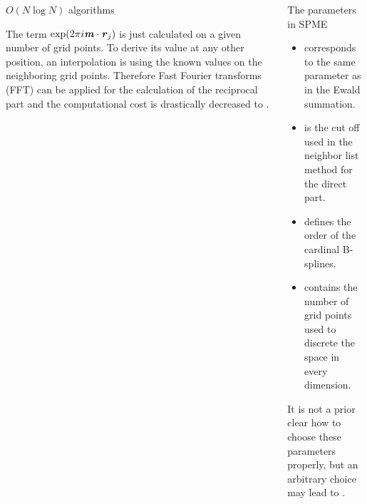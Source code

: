 \documentclass[final,hyperref={pdfpagelabels=false}]{beamer}
\begin{document}
\begin{frame}{}
\begin{columns}[t]
\begin{column}{.32\linewidth}
\begin{block}{\large $O(N \log N)$ algorithms}
\begin{minipage}[c]{.975\linewidth}
           The term $ \exp (2 \pi i
          \textbf{\textit{m}} \cdot \textbf{\textit{r}}_j) $ is just calculated on a given number of grid
          points. To derive its value at any other position, an interpolation is 
          using the known values on the neighboring grid points. Therefore 
          Fast Fourier transforms (FFT) can be applied for the calculation of
          the reciprocal part and the computational cost is drastically
          decreased to .
        \end{minipage}
        \end{block}
      \end{column}
      \begin{column}{.32\linewidth}
        \vfill
        \begin{block}{\large The parameters in SPME}
          \vspace{1ex}
          \begin{minipage}[c]{.975\linewidth}
          \begin{itemize}
          \item \bluec{$\beta$} corresponds to the same parameter as in the Ewald summation.
          \item {} is the cut off used in the neighbor list method
            for the direct part.
          \item {}  defines the order of the cardinal B-splines.
          \item {}  contains the number of grid points used to
            discrete the space in every dimension.
          \end{itemize}
          It is not a prior clear how to choose these parameters properly, but
          an arbitrary choice may lead to .
          

\end{minipage}
\end{block}
\end{column}
\end{columns}
\end{frame}
\end{document}
